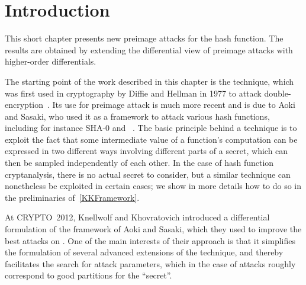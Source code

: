 \section{Introduction}

This short chapter presents new preimage attacks for the \shaone hash function.
The results are obtained by extending the differential view of \mitm preimage attacks with higher-order differentials.

\medskip

The starting point of the work described in this chapter is the \mitm technique, which
was first used in cryptography by Diffie and Hellman in 1977 to attack double-encryption~\cite{DH77}.
Its use for preimage attack is much more recent and is due to Aoki and Sasaki, who used it as a framework to
attack various hash functions, including for instance SHA-0 and \shaone~\cite{AS09}.
The basic principle behind a \mitm technique is to exploit the fact that some intermediate value of
a function's computation can be expressed
in two different ways involving different parts of a secret, which can then be sampled independently of
each other. In the case of hash function cryptanalysis, there is no actual secret to consider, but a
similar technique can nonetheless be exploited in certain cases; we show in more details how to do
so in the preliminaries of~\autoref{KKFramework}.

At CRYPTO~2012, Knellwolf and Khovratovich introduced a differential formulation of the \mitm framework
of Aoki and Sasaki, which they used to improve the best attacks on \shaone. One of the main interests
of their approach is that it simplifies the formulation of several advanced extensions of
the \mitm technique, and thereby facilitates the search for attack parameters, which in the case
of \mitm attacks roughly correspond to good partitions for the ``secret''.

